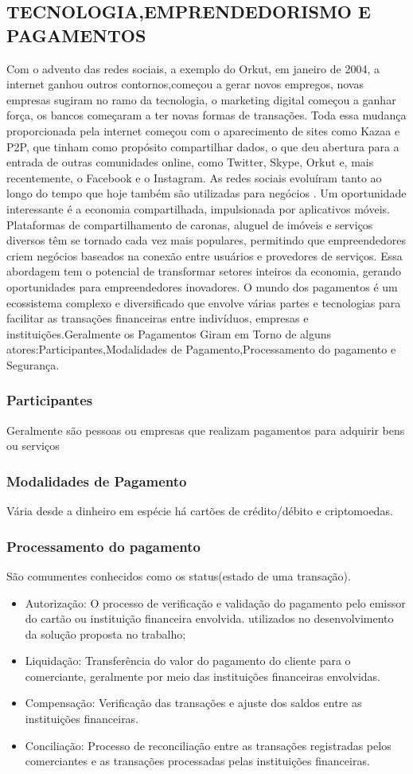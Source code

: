 \documentclass[a4paper,12pt]{article}
\begin{document}
\subsection{TECNOLOGIA,EMPRENDEDORISMO E PAGAMENTOS}
Com o advento das redes sociais, a exemplo do Orkut, em janeiro de 2004, a internet ganhou outros contornos,começou a gerar novos empregos, novas empresas sugiram no ramo da tecnologia, o marketing digital começou a ganhar força, os bancos começaram a ter novas formas de transações. Toda essa mudança proporcionada pela internet começou com o aparecimento de sites como Kazaa e P2P, que tinham como propósito compartilhar dados, o que deu abertura para a entrada de outras comunidades online, como Twitter, Skype, Orkut e, mais recentemente, o Facebook e o Instagram. As redes sociais evoluíram tanto ao longo do tempo que hoje também são utilizadas para negócios \cite{internet}.
Um oportunidade interessante é a economia compartilhada, impulsionada por aplicativos móveis. Plataformas de compartilhamento de caronas, aluguel de imóveis e serviços diversos têm se tornado cada vez mais populares, permitindo que empreendedores criem negócios baseados na conexão entre usuários e provedores de serviços. Essa abordagem tem o potencial de transformar setores inteiros da economia, gerando oportunidades para empreendedores inovadores.
O mundo dos pagamentos é um ecossistema complexo e diversificado que envolve várias partes e tecnologias para facilitar as transações financeiras entre indivíduos, empresas e instituições.Geralmente os Pagamentos Giram em Torno de alguns atores:Participantes,Modalidades de Pagamento,Processamento do pagamento e Segurança.
\subsubsection{Participantes}
Geralmente são pessoas ou empresas que realizam pagamentos para adquirir bens ou serviços
\subsubsection{Modalidades de Pagamento}
Vária desde a dinheiro em espécie há cartões de crédito/débito e criptomoedas.
\subsubsection{Processamento do pagamento}
São comumentes conhecidos como os status(estado de uma transação).
\begin{itemize}
    \item Autorização: O processo de verificação e validação do pagamento pelo emissor do cartão ou instituição financeira envolvida.
          utilizados no desenvolvimento da solução proposta no trabalho;
    \item Liquidação: Transferência do valor do pagamento do cliente para o comerciante, geralmente por meio das instituições financeiras envolvidas.
    \item Compensação: Verificação das transações e ajuste dos saldos entre as instituições financeiras.
    \item Conciliação: Processo de reconciliação entre as transações registradas pelos comerciantes e as transações processadas pelas instituições financeiras.
\end{itemize}
\end{document}
